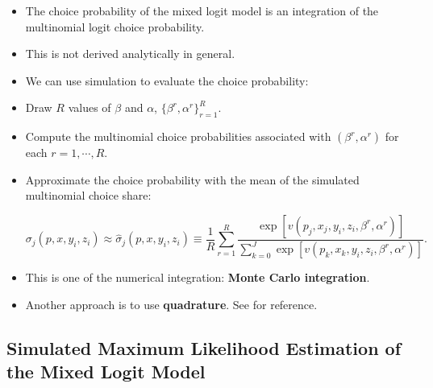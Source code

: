 \documentclass[]{book}
\providecommand{\tightlist}{%
  \setlength{\itemsep}{0pt}\setlength{\parskip}{0pt}}
\begin{document}
\begin{itemize}
\tightlist
\item
  The choice probability of the mixed logit model is an integration of
  the multinomial logit choice probability.
\item
  This is not derived analytically in general.
\item
  We can use simulation to evaluate the choice probability:
\item
  Draw \(R\) values of \(\beta\) and \(\alpha\),
  \(\{\beta^r, \alpha^r \}_{r = 1}^R\).
\item
  Compute the multinomial choice probabilities associated with
  \((\beta^r, \alpha^r)\) for each \(r = 1, \cdots, R\).
\item
  Approximate the choice probability with the mean of the simulated
  multinomial choice share:

  \begin{equation}
  \sigma_{j}(p, x, y_i, z_i) \approx \hat{\sigma}_{j}(p, x, y_i, z_i) \equiv \frac{1}{R} \sum_{r = 1}^R  \frac{\exp[v(p_j, x_j, y_i, z_i, \beta^r, \alpha^r)]}{\sum_{k = 0}^J \exp[v(p_k, x_k, y_i, z_i, \beta^r, \alpha^r)]}.
  \end{equation}
\item
  This is one of the numerical integration: \textbf{Monte Carlo
  integration}.
\item
  Another approach is to use \textbf{quadrature}. See \citet{Judd1998}
  for reference.
\end{itemize}

\subsection{Simulated Maximum Likelihood Estimation of the Mixed Logit
Model}\label{simulated-maximum-likelihood-estimation-of-the-mixed-logit-model-1}
\end{document}
